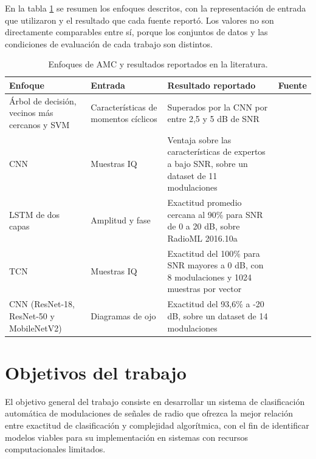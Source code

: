 En la tabla \ref{tab:enfoquesAMC} se resumen los enfoques descritos, con la representación de entrada que utilizaron y el resultado que cada fuente reportó. Los valores no son directamente comparables entre sí, porque los conjuntos de datos y las condiciones de evaluación de cada trabajo son distintos.

\begin{table}[h]
	\centering
	\caption{Enfoques de AMC y resultados reportados en la literatura.}
	\begin{tabular}{p{3.1cm} p{2.6cm} p{4.9cm} l}
		\toprule
		\textbf{Enfoque} & \textbf{Entrada} & \textbf{Resultado reportado} & \textbf{Fuente} \\
		\midrule
		Árbol de decisión, vecinos más cercanos y SVM & Características de momentos cíclicos & Superados por la CNN por entre 2,5 y 5 dB de SNR & \cite{oshea2016convolutional} \\
		CNN & Muestras IQ & Ventaja sobre las características de expertos a bajo SNR, sobre un dataset de 11 modulaciones & \cite{oshea2016convolutional} \\
		LSTM de dos capas & Amplitud y fase & Exactitud promedio cercana al 90\% para SNR de 0 a 20 dB, sobre RadioML 2016.10a & \cite{rajendran2018distributed} \\
		TCN & Muestras IQ & Exactitud del 100\% para SNR mayores a 0 dB, con 8 modulaciones y 1024 muestras por vector & \cite{ghasemi2019spectrum} \\
		CNN (ResNet-18, ResNet-50 y MobileNetV2) & Diagramas de ojo & Exactitud del 93,6\% a -20 dB, sobre un dataset de 14 modulaciones & \cite{rehman2025dlamc} \\
		\bottomrule
	\end{tabular}
	\label{tab:enfoquesAMC}
\end{table}


\section{Objetivos del trabajo}
\label{sec:objetivos}

El objetivo general del trabajo consiste en desarrollar un sistema de clasificación automática de modulaciones de señales de radio que ofrezca la mejor relación entre exactitud de clasificación y complejidad algorítmica, con el fin de identificar modelos viables para su implementación en sistemas con recursos computacionales limitados.

